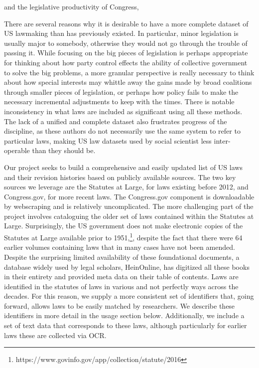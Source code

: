 \documentclass[fleqn,10pt]{wlscirep}
\begin{document}
and the legislative productivity of Congress, %

There are several reasons why it is desirable to have a more complete dataset of US lawmaking than has previously existed. In particular, minor legislation is usually major to somebody, otherwise they would not go through the trouble of passing it. While focusing on the big pieces of legislation is perhaps appropriate for thinking about how party control effects the ability of collective government to solve the big problems, a more granular perspective is really necessary to think about how special interests may whittle away the gains made by broad coalitions through smaller pieces of legislation, or perhaps how policy fails to make the necessary incremental adjustments to keep with the times. There is notable inconsistency in what laws are included as significant using all these methods. The lack of a unified and complete dataset also frustrates progress of the discipline, as these authors do not necessarily use the same system to refer to particular laws, making US law datasets used by social scientist less inter-operable than they should be. 

Our project seeks to build a comprehensive and easily updated list of US laws and their revision histories based on publicly available sources. The two key sources we leverage are the Statutes at Large, for laws existing before 2012, and Congress.gov, for more recent laws. The Congress.gov component is downloadable by webscraping and is relatively uncomplicated.  The more challenging part of the project involves cataloguing the older set of laws contained within the Statutes at Large. Surprisingly, the US government does not make electronic copies of the Statutes at Large available prior to 1951,\footnote{https://www.govinfo.gov/app/collection/statute/2016}, despite the fact that there were 64 earlier volumes containing laws that in many cases have not been amended. Despite the surprising limited availability of these foundational documents, a database widely used by legal scholars, HeinOnline, has digitized all these books in their entirety and provided meta data on their table of contents. Laws are identified in the statutes of laws in various and not perfectly ways across the decades. For this reason, we supply a more consistent set of identifiers that, going forward, allows laws to be easily matched by researchers. We describe these identifiers in more detail in the usage section below. Additionally, we include a set of text data that corresponds to these laws, although particularly for earlier laws these are collected via OCR. 
\end{document}
